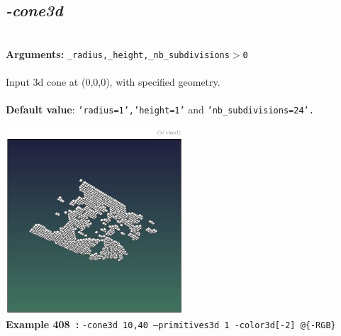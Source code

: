 \documentclass[a4paper,11pt,twoside]{book}
\begin{document}
\subsection{\emph{-cone3d} }\vspace*{-0.5em}
~\\\textbf{Arguments: } 
{\small \texttt{\_radius,\_height,\_nb\_subdivisions$>$0}}\\~\\
Input 3d cone at (0,0,0), with specified geometry.
~\\~\\\textbf{Default value}: {\small \texttt{'radius=1','height=1'} and \texttt{'nb\_subdivisions=24'.}}
\begin{center}\includegraphics[keepaspectratio=true,height=7cm,width=\textwidth]{img/gmic_def408.jpg}\\
{\footnotesize \textbf{Example 408~:} \texttt{-cone3d 10,40 --primitives3d 1 -color3d[-2] @\{-RGB\}}}
\end{center}
\end{document}
